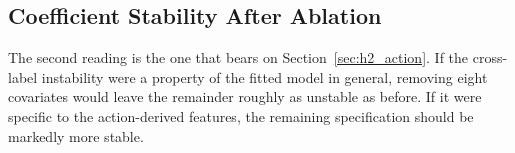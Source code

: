 \begin{table}[H]
    \centering\small
    \caption{Discrimination and best-threshold Utility Score with and without
    the \pcAblNDropped{} action-derived features. Both arms are fitted on the
    same training rows and scored on the same test rows.
    \textbf{[E] exploratory.}}
    \label{tab:ablation}
\end{table}

\subsection{Coefficient Stability After Ablation}

The second reading is the one that bears on Section~\ref{sec:h2_action}. If the
cross-label instability were a property of the fitted model in general, removing
eight covariates would leave the remainder roughly as unstable as before. If it
were specific to the action-derived features, the remaining specification should
be markedly more stable.

